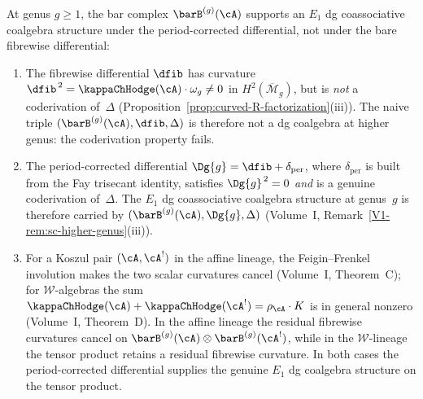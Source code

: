 \begin{theorem}
\label{thm:curved-swiss-cheese}
At genus $g \geq 1$, the bar complex
$\barB^{(g)}(\cA)$ supports an $E_1$ dg coassociative coalgebra structure
under the period-corrected differential, not under the bare
fibrewise differential:
\begin{enumerate}[label=\textup{(\roman*)}]
\item The fibrewise differential $\dfib$ has curvature
 $\dfib^{\,2} = \kappaChHodge(\cA) \cdot \omega_g \neq 0$ in
 $H^{2}(\overline{\mathcal{M}}_g)$, but is \emph{not} a
 coderivation of~$\Delta$
 (Proposition~\ref{prop:curved-R-factorization}\textup{(iii)}).
 The naive triple
 $(\barB^{(g)}(\cA), \dfib, \Delta)$ is therefore not a
 dg coalgebra at higher genus: the coderivation property fails.
\item The period-corrected differential
 $\Dg{g} = \dfib + \delta_{\mathrm{per}}$, where
 $\delta_{\mathrm{per}}$ is built from the Fay trisecant
 identity, satisfies $\Dg{g}^{\,2} = 0$ \emph{and} is a
 genuine coderivation of~$\Delta$. The $E_1$ dg coassociative
 coalgebra structure at genus~$g$ is therefore carried by
 $(\barB^{(g)}(\cA), \Dg{g}, \Delta)$
 (Volume~I, Remark~\ref{V1-rem:sc-higher-genus}\textup{(iii)}).
\item For a Koszul pair $(\cA, \cA^!)$ in the affine lineage,
 the Feigin--Frenkel involution makes the two scalar curvatures cancel
 (Volume~I, Theorem~C); for
 $\mathcal{W}$-algebras the sum
 $\kappaChHodge(\cA) + \kappaChHodge(\cA^!) = \rho_\cA \cdot K$ is in
 general nonzero (Volume~I, Theorem~D). In the affine
 lineage the residual fibrewise curvatures cancel on
 $\barB^{(g)}(\cA) \otimes \barB^{(g)}(\cA^!)$, while in the
 $\mathcal{W}$-lineage the tensor product retains a residual
 fibrewise curvature. In both cases the period-corrected
 differential supplies the genuine $E_1$ dg coalgebra
 structure on the tensor product.
\end{enumerate}
\end{theorem}


